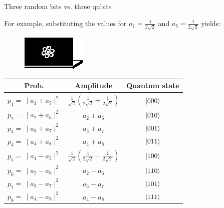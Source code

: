 \documentclass[10pt]{beamer}
\begin{document}
{
\begin{frame}[fragile]{Three random bits vs. three qubits}

For example, substituting the values for $a_1=\frac{1}{2\sqrt{2}}$ and $a_5=\frac{1}{2\sqrt{2}}$ yields:
\centering
\begin{figure}
\includegraphics[scale=1.2]{Vectors/laptop_q.eps}\\
\end{figure}
\vspace{0.5cm}
\begin{table}
\begin{tabular}{c | c | c}
	Prob. & Amplitude & Quantum state \\
	\midrule
	$p_1 = \,\mid a_1+a_5 \mid^2$ & $\frac{1}{\sqrt{2}}(\frac{1}{2\sqrt{2}}+\frac{1}{2\sqrt{2}})$ & $\ket{000}$ \\
	$p_2 =\, \mid a_2+a_6 \mid^2$ & $a_2+a_6$ & $\ket{010}$ \\
	$p_3 = \,\mid a_3+a_7 \mid^2$ & $a_3+a_7$ & $\ket{001}$ \\
	$p_4 = \,\mid a_4+a_8 \mid^2$ & $a_4+a_8$ & $\ket{011}$ \\
	$p_5 = \,\mid a_1-a_5 \mid^2$ & $\frac{1}{\sqrt{2}}(\frac{1}{2\sqrt{2}}-\frac{1}{2\sqrt{2}})$ & $\ket{100}$ \\
	$p_6 = \,\mid a_2-a_6 \mid^2$ & $a_2-a_6$ & $\ket{110}$ \\
	$p_7 = \,\mid a_3-a_7 \mid^2$ & $a_3-a_7$ & $\ket{101}$ \\
	$p_8 = \,\mid a_4-a_8 \mid^2$ & $a_4-a_8$ & $\ket{111}$ \\
	
\end{tabular}
\end{table}

\end{frame}
}
\end{document}
